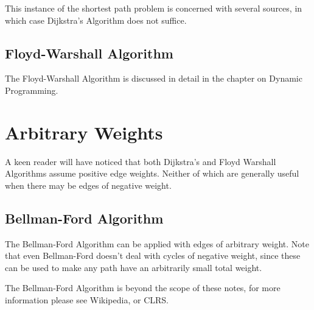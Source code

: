This instance of the shortest path problem is concerned with several
sources, in which case Dijkstra's Algorithm does not suffice.

\subsection{Floyd-Warshall Algorithm}

The Floyd-Warshall Algorithm is discussed in detail in the chapter on
Dynamic Programming.

\section{Arbitrary Weights}

A keen reader will have noticed that both Dijkstra's and Floyd
Warshall Algorithms assume positive edge weights.  Neither of which
are generally useful when there may be edges of negative weight.

\subsection{Bellman-Ford Algorithm}

The Bellman-Ford Algorithm can be applied with edges of arbitrary
weight.  Note that even Bellman-Ford doesn't deal with cycles of
negative weight, since these can be used to make any path have an
arbitrarily small total weight.

The Bellman-Ford Algorithm is beyond the scope of these notes, for
more information please see Wikipedia, or CLRS.
